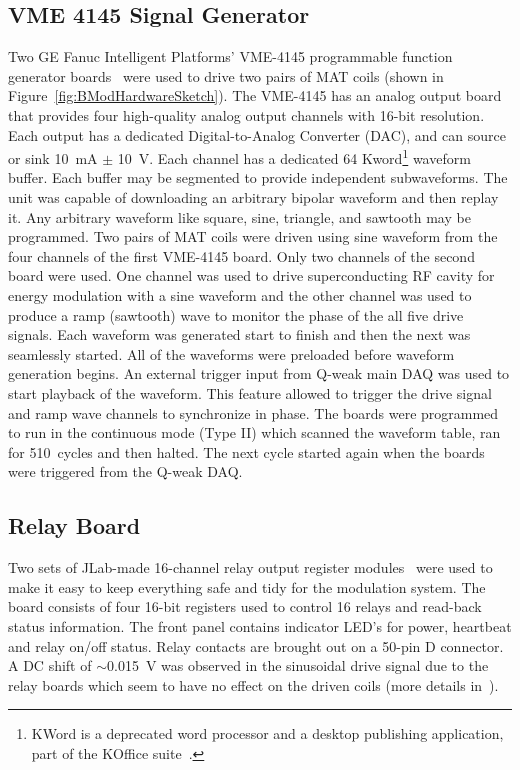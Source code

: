 \subsection{VME 4145 Signal Generator}
\label{VME 4145 Signal Generator}
Two GE Fanuc Intelligent Platforms' VME-4145 programmable function generator boards~\cite{manual_vmivme4145} were used to drive two pairs of MAT coils (shown in Figure~\ref{fig:BModHardwareSketch}). The VME-4145 has an analog output board that provides four high-quality analog output channels with 16-bit resolution. Each output has a dedicated Digital-to-Analog Converter (DAC), and can source or sink 10~mA $\pm$ 10~V. Each channel has a dedicated 64 Kword\footnote{KWord is a deprecated word processor and a desktop publishing application, part of the KOffice suite~\cite{website:kword}.} waveform buffer. Each buffer may be segmented to provide independent subwaveforms. The unit was capable of downloading an arbitrary bipolar waveform and then replay it. Any arbitrary waveform like square, sine, triangle, and sawtooth may be programmed. Two pairs of MAT coils were driven using sine waveform from the four channels of the first VME-4145 board. Only two channels of the second board were used. One channel was used to drive superconducting RF cavity for energy modulation with a sine waveform and the other channel was used to produce a ramp (sawtooth) wave to monitor the phase of the all five drive signals. Each waveform was generated start to finish and then the next was seamlessly started. All of the waveforms were preloaded before waveform generation begins. An external trigger input from Q-weak main DAQ was used to start playback of the waveform. This feature allowed to trigger the drive signal and ramp wave channels to synchronize in phase. The boards were programmed to run in the continuous mode (Type II) which scanned the waveform table, ran for 510~cycles and then halted. The next cycle started again when the boards were triggered from the Q-weak DAQ. 


\subsection{Relay Board}
\label{Relay Board}
Two sets of JLab-made 16-channel relay output register modules~\cite{jlab_relay} were used to make it easy to keep everything safe and tidy for the modulation system. The board consists of four 16-bit registers used to control 16 relays and read-back status information. The front panel contains indicator LED's for power, heartbeat and relay on/off status. Relay contacts are brought out on a 50-pin D connector.
A DC shift of $\sim$0.015~V was observed in the sinusoidal drive signal due to the relay boards which seem to have no effect on the driven coils (more details in~\cite{presentation:nur_bmod_1312}).

